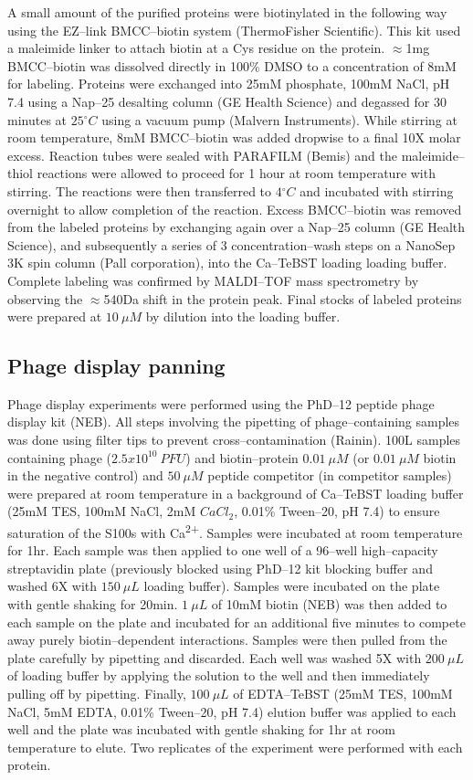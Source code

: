 A small amount of the purified proteins were biotinylated in the following
way using the EZ--link BMCC--biotin system (ThermoFisher Scientific).
This kit used a maleimide linker to attach biotin at a Cys residue
on the protein. $\approx$1mg BMCC--biotin was dissolved directly in
100\% DMSO to a concentration of 8mM for labeling. Proteins were exchanged
into 25mM phosphate, 100mM NaCl, pH 7.4 using a Nap--25 desalting column
(GE Health Science) and degassed for 30 minutes at $25{^\circ}C$
using a vacuum pump (Malvern Instruments). While stirring at room
temperature, 8mM BMCC--biotin was added dropwise to a final 10X molar
excess. Reaction tubes were sealed with PARAFILM (Bemis) and the maleimide--thiol
reactions were allowed to proceed for 1 hour at room temperature with
stirring. The reactions were then transferred to $4{^\circ}C$ and
incubated with stirring overnight to allow completion of the reaction.
Excess BMCC--biotin was removed from the labeled proteins by exchanging
again over a Nap--25 column (GE Health Science), and subsequently a
series of 3 concentration--wash steps on a NanoSep 3K spin column (Pall
corporation), into the Ca--TeBST loading loading buffer. Complete labeling
was confirmed by MALDI--TOF mass spectrometry by observing the $\approx$540Da
shift in the protein peak. Final stocks of labeled proteins were prepared
at $10\ \mu M$ by dilution into the loading buffer. 

\subsection{Phage display panning }

Phage display experiments were performed using the PhD--12 peptide
phage display kit (NEB). All steps involving the pipetting of phage--containing
samples was done using filter tips to prevent cross--contamination
(Rainin). 100\textmu L samples containing phage ($2.5x10^{10}\ PFU$)
and biotin--protein $0.01\ \mu M$ (or $0.01\ \mu M$ biotin in the
negative control) and $50\ \mu M$ peptide competitor (in competitor
samples) were prepared at room temperature in a background of Ca--TeBST
loading buffer (25mM TES, 100mM NaCl, 2mM $CaCl_{2}$, 0.01\% Tween--20,
pH 7.4) to ensure saturation of the S100s with Ca\textsuperscript{2+}.
Samples were incubated at room temperature for 1hr. Each sample was
then applied to one well of a 96--well high--capacity streptavidin plate
(previously blocked using PhD--12 kit blocking buffer and washed 6X
with $150\ \mu L$ loading buffer). Samples were incubated on the
plate with gentle shaking for 20min. $1\ \mu L$ of 10mM biotin (NEB)
was then added to each sample on the plate and incubated for an additional
five minutes to compete away purely biotin--dependent interactions.
Samples were then pulled from the plate carefully by pipetting and
discarded. Each well was washed 5X with $200\ \mu L$ of loading buffer
by applying the solution to the well and then immediately pulling
off by pipetting. Finally, $100\ \mu L$ of EDTA--TeBST (25mM TES,
100mM NaCl, 5mM EDTA, 0.01\% Tween--20, pH 7.4) elution buffer was
applied to each well and the plate was incubated with gentle shaking
for 1hr at room temperature to elute. Two replicates of the experiment
were performed with each protein. 


